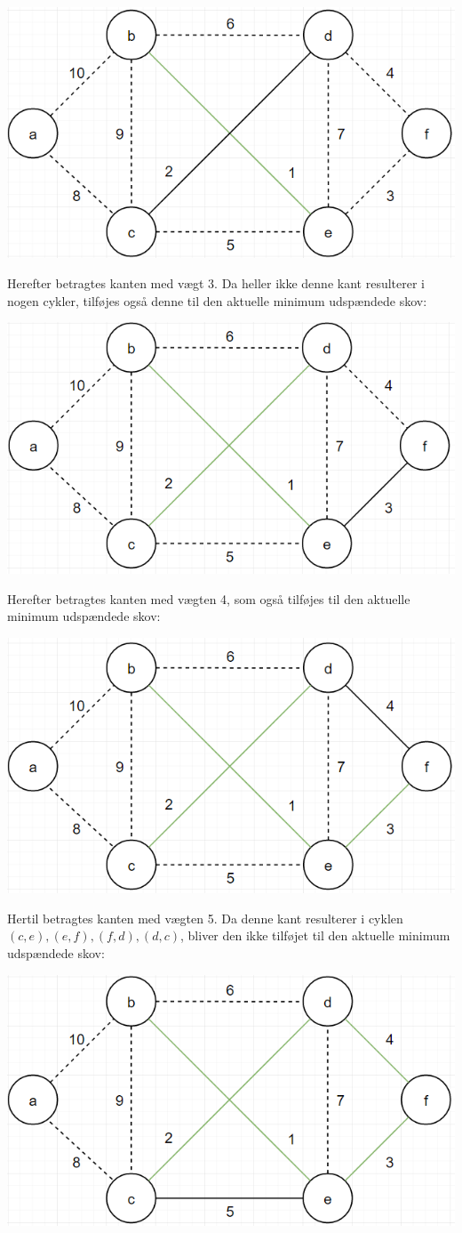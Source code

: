 \documentclass{report}
\begin{document}
\begin{center}
    \includegraphics[height = 5 cm]{../entities/kruskal2}
\end{center}
Herefter betragtes kanten med vægt 3. Da heller ikke denne kant resulterer i nogen cykler, tilføjes også denne til den aktuelle minimum udspændede skov:
\begin{center}
    \includegraphics[height = 5 cm]{../entities/kruskal3}
\end{center}
Herefter betragtes kanten med vægten 4, som også tilføjes til den aktuelle minimum udspændede skov:
\begin{center}
    \includegraphics[height = 5 cm]{../entities/kruskal4}
\end{center}
Hertil betragtes kanten med vægten 5. Da denne kant resulterer i cyklen $(c, e), (e, f), (f, d), (d, c)$, bliver den ikke tilføjet til den aktuelle minimum udspændede skov:
\begin{center}
    \includegraphics[height = 5 cm]{../entities/kruskal5}
\end{center}
\end{document}
